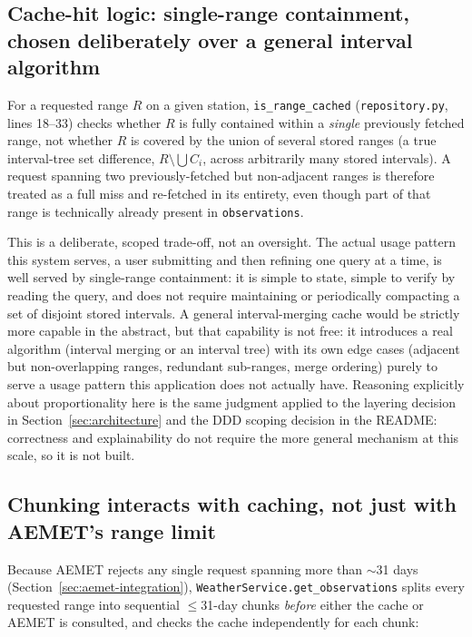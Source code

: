 \documentclass[11pt,a4paper]{article}
\begin{document}
\subsection{Cache-hit logic: single-range containment, chosen deliberately over a general interval algorithm}

For a requested range $R$ on a given station, \texttt{is\_range\_cached}
(\texttt{repository.py}, lines 18--33) checks whether $R$ is fully
contained within a \emph{single} previously fetched range, not whether $R$
is covered by the union of several stored ranges (a true interval-tree set
difference, $R \setminus \bigcup C_i$, across arbitrarily many stored
intervals). A request spanning two previously-fetched but non-adjacent
ranges is therefore treated as a full miss and re-fetched in its entirety,
even though part of that range is technically already present in
\texttt{observations}.

This is a deliberate, scoped trade-off, not an oversight. The actual usage
pattern this system serves, a user submitting and then refining one query
at a time, is well served by single-range containment: it is simple to
state, simple to verify by reading the query, and does not require
maintaining or periodically compacting a set of disjoint stored intervals.
A general interval-merging cache would be strictly more capable in the
abstract, but that capability is not free: it introduces a real algorithm
(interval merging or an interval tree) with its own edge cases (adjacent
but non-overlapping ranges, redundant sub-ranges, merge ordering) purely to
serve a usage pattern this application does not actually have. Reasoning
explicitly about proportionality here is the same judgment applied to the
layering decision in Section~\ref{sec:architecture} and the DDD scoping
decision in the README: correctness and explainability do not require the
more general mechanism at this scale, so it is not built.

\subsection{Chunking interacts with caching, not just with AEMET's range limit}

Because AEMET rejects any single request spanning more than $\sim$31 days
(Section~\ref{sec:aemet-integration}), \texttt{WeatherService.get\_observations}
splits every requested range into sequential $\le$31-day chunks
\emph{before} either the cache or AEMET is consulted, and checks the cache
independently for each chunk:
\end{document}
